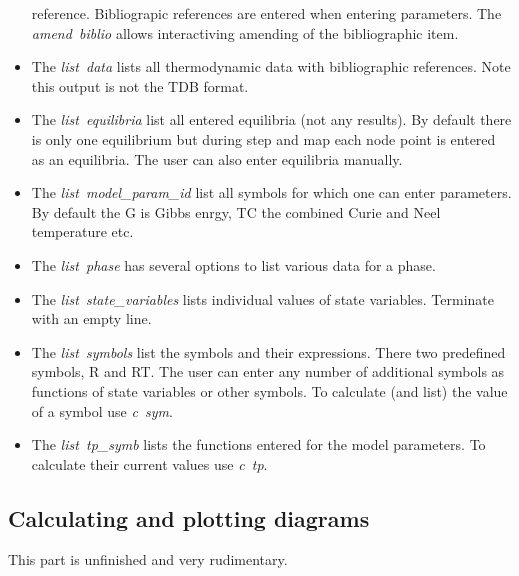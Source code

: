 \documentclass[12pt]{article}
\begin{document}
\begin{itemize}
  reference.  Bibliograpic references are entered when entering
  parameters.  The {\em amend~biblio} allows interactiving amending of
  the bibliographic item.
\item The {\em list~data} lists all thermodynamic data with
  bibliographic references.  Note this output is not the TDB format.
\item The {\em list~equilibria} list all entered equilibria (not
  any results).  By default there is only one equilibrium but during step
  and map each node point is entered as an equilibria.  The user can
  also enter equilibria manually.
\item The {\em list~model\_param\_id} list all symbols for which one
  can enter parameters.  By default the G is Gibbs enrgy, TC the
  combined Curie and Neel temperature etc.
\item The {\em list~phase} has several options to list various data
  for a phase.
\item The {\em list~state\_variables} lists individual values of state
  variables.  Terminate with an empty line.
\item The {\em list~symbols} list the symbols and their expressions.
  There two predefined symbols, R and RT.  The user can enter any
  number of additional symbols as functions of state variables or
  other symbols.  To calculate (and list) the value of a symbol use
  {\em c~sym}.
\item The {\em list~tp\_symb} lists the functions entered for the
  model parameters.  To calculate their current values use {\em c~tp}.
\end{itemize}

\subsection{Calculating and plotting diagrams}

This part is unfinished and very rudimentary.
\end{document}
